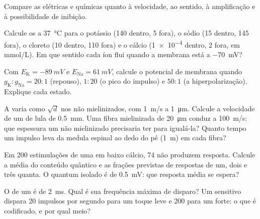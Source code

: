 \begin{exercise}[$\star$]\label{exo:b2:neurons-synapses:4}
Compare as  elétricas e químicas quanto à velocidade, ao
sentido, à amplificação e à possibilidade de inibição.
\end{exercise}

\begin{exercise}[$\star\star$]\label{exo:b2:neurons-synapses:5}
Calcule os  a \qty{37}{\celsius} para o potássio
(140 dentro, 5 fora), o sódio (15 dentro, 145 fora), o cloreto (10
dentro, 110 fora) e o cálcio (\qty{1e-4}{} dentro, 2 fora, em
\unit{mmol/L}). Em que sentido cada íon flui quando a membrana está a
\qty{-70}{mV}?
\end{exercise}

\begin{exercise}[$\star\star$]\label{exo:b2:neurons-synapses:6}
Com $E_{\mathrm K} = \qty{-89}{mV}$ e $E_{\mathrm{Na}} =
\qty{+61}{mV}$, calcule o potencial de membrana quando $g_{\mathrm K} :
g_{\mathrm{Na}} = 20 : 1$ (repouso), $1 : 20$ (o pico do impulso) e
$50 : 1$ (a hiperpolarização). Explique cada estado.
\end{exercise}

\begin{exercise}[$\star\star$]\label{exo:b2:neurons-synapses:7}
A  varia como $\sqrt d$ nos  não
mielinizados, com \qty{1}{m/s} a \qty{1}{\micro m}. Calcule a velocidade
de um  de lula de \qty{0.5}{mm}. Uma fibra mielinizada de
\qty{20}{\micro m} conduz a \qty{100}{m/s}: que espessura um  não
mielinizado precisaria ter para igualá-la? Quanto tempo um impulso leva
da medula espinal ao dedo do pé (\qty{1}{m}) em cada fibra?
\end{exercise}

\begin{exercise}[$\star\star$]\label{exo:b2:neurons-synapses:8}
Em 200 estimulações de uma  em baixo cálcio, 74 não produzem
resposta. Calcule a média do conteúdo quântico e as frações previstas
de respostas de um, dois e três quanta. O quantum isolado é de
\qty{0.5}{mV}: que resposta média se espera?
\end{exercise}

\begin{exercise}[$\star\star$]\label{exo:b2:neurons-synapses:9}
O  de um  é de \qty{2}{ms}. Qual é sua
frequência máxima de disparo? Um  sensitivo dispara 20 impulsos
por segundo para um toque leve e 200 para um forte: o que é codificado,
e por qual meio?
\end{exercise}

